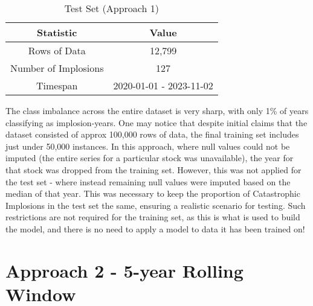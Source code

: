 \documentclass[a4paper]{report}
\begin{document}
\begin{table}[htbp]
  \centering
  \begin{tabular}{|c|c|}
  \hline
  \textbf{Statistic} & \textbf{Value} \\
  \hline
  Rows of Data & 12,799 \\
  Number of Implosions & 127 \\
  Timespan & 2020-01-01 - 2023-11-02 \\
  \hline
  \end{tabular}
  \caption{Test Set (Approach 1)}
  \label{tab:test_set_app1}
\end{table}The class imbalance across the entire dataset is very sharp, with only 1\% of years classifying as implosion-years. One may notice that despite initial claims that 
the dataset consisted of approx 100,000 rows of data, the final training set includes just under 50,000 instances. In this approach, where null values could not be imputed (the entire series for 
a particular stock was unavailable), the year for that stock was dropped from the training set. However, this was not applied for the test set - where instead remaining null values were imputed 
based on the median of that year. This was necessary to keep the proportion of Catastrophic Implosions in the test set the same, ensuring a realistic scenario for testing. Such restrictions 
are not required for the training set, as this is what is used to build the model, and there is no need to apply a model to data it has been trained on!

\section{Approach 2 - 5-year Rolling Window}
\end{document}
